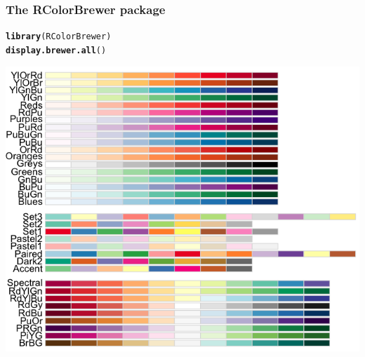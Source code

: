 \documentclass{beamer}\usepackage[]{graphicx}\usepackage[]{color}
\makeatletter
\newcommand{\hlstd}[1]{\textcolor[rgb]{0.345,0.345,0.345}{#1}}%
\newcommand{\hlkwd}[1]{\textcolor[rgb]{0.737,0.353,0.396}{\textbf{#1}}}%
\newenvironment{kframe}{%
 \def\at@end@of@kframe{}%
 \ifinner\ifhmode%
  \def\at@end@of@kframe{\end{minipage}}%
  \begin{minipage}{\columnwidth}%
 \fi\fi%
 \def\FrameCommand##1{\hskip\@totalleftmargin \hskip-\fboxsep
 \colorbox{shadecolor}{##1}\hskip-\fboxsep
     \hskip-\linewidth \hskip-\@totalleftmargin \hskip\columnwidth}%
 \MakeFramed {\advance\hsize-\width
   \@totalleftmargin\z@ \linewidth\hsize
   \@setminipage}}%
 {\par\unskip\endMakeFramed%
 \at@end@of@kframe}
\newenvironment{knitrout}{}{} %
\makeatother
\begin{document}
\begin{frame}[fragile]
\frametitle{The RColorBrewer package}
\begin{knitrout}\footnotesize
{}\color{fgcolor}\begin{kframe}
\begin{alltt}
\hlkwd{library}\hlstd{(RColorBrewer)}
\hlkwd{display.brewer.all}\hlstd{()}
\end{alltt}
\end{kframe}
\end{knitrout}
\begin{center}
\includegraphics[scale=0.25]{images/color_palette.png}
\end{center}
\end{frame}

\end{document}
